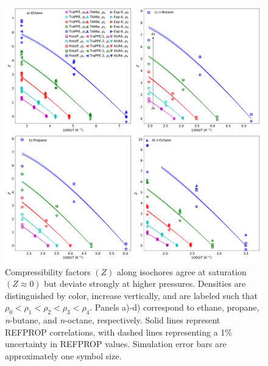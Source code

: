 \documentclass[preprint,letterpaper,floatfix,citeautoscript,aip,jcp]{revtex4-1}
\begin{document}
\begin{figure}[p!]
	\centering
	\includegraphics[width=6.4in]{IC_normal_alkanes_all_models}
	\caption{Compressibility factors $(Z)$ along isochores agree at saturation $(Z \approx 0)$ but deviate strongly at higher pressures. Densities are distinguished by color, increase vertically, and are labeled such that $\rho_0 < \rho_1 < \rho_2 < \rho_3 < \rho_4$.  Panels a)-d) correspond to ethane, propane, \textit{n}-butane, and \textit{n}-octane, respectively.
Solid lines represent REFPROP correlations, with dashed lines representing a 1\% uncertainty in REFPROP values. Simulation error bars are approximately one symbol size.}
	\label{fig:IC_normal_alkanes}
\end{figure}
\end{document}
